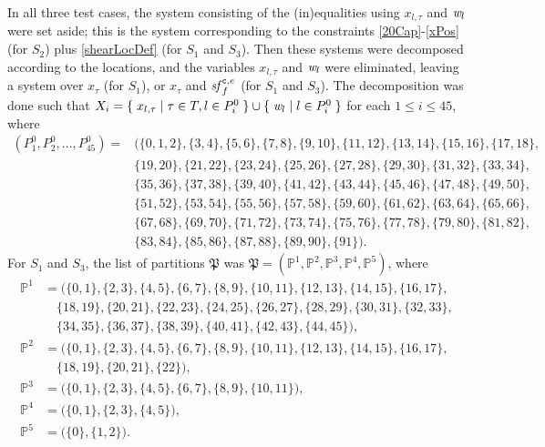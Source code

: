 In all three test cases, the system consisting of the (in)equalities using $x_{l,\tau}$ and $\mathit{w}_l$ were set aside; this is the system corresponding to the constraints \eqref{20Cap}-\eqref{xPos} (for $S_2$) plus \eqref{shearLocDef} (for $S_1$ and $S_3$). Then these systems were decomposed according to the locations, and the variables $x_{l,\tau}$ and $\mathit{w}_l$ were eliminated, leaving a system over $x_\tau$ (for $S_1$), or $x_\tau$ and $\mathit{sf}^{\texttt{c},e}_f$ (for $S_1$ and $S_3$). The decomposition was done such that $X_i = \{\;{x_{l,\tau}}\;|\;{\tau \in T, l\in P^0_i}\;\}\cup\{\;{\mathit{w}_l}\;|\;{l\in P^0_i}\;\}$ for each $1\leq i \leq 45$, where  
\begin{align*}
(P^0_1,P^0_2,\ldots, P^0_{45}) =
&\big(\{0,1,2\}, \{3,4\}, \{5,6\}, \{7,8\}, \{9,10\}, \{11,12\}, \{13,14\}, \{15,16\}, \{17,18\}, \\
&\{19,20\}, \{21,22\},\{23,24\}, \{25,26\}, \{27,28\}, \{29,30\}, \{31,32\}, \{33,34\}, \\
&\{35,36\}, \{37,38\}, \{39,40\}, \{41,42\}, \{43,44\}, \{45,46\}, \{47,48\}, \{49,50\}, \\
&\{51,52\}, \{53,54\}, \{55,56\}, \{57,58\}, \{59,60\}, \{61,62\}, \{63,64\}, \{65,66\}, \\
&\{67,68\}, \{69,70\}, \{71,72\}, \{73,74\}, \{75,76\}, \{77,78\}, \{79,80\}, \{81,82\}, \\
&\{83,84\}, \{85,86\}, \{87,88\}, \{89,90\}, \{91\}\big).
\end{align*}
For $S_1$ and $S_3$, the list of partitions $\mathfrak{P}$ was $\mathfrak{P} = (\mathbb{P}^1, \mathbb{P}^2, \mathbb{P}^3, \mathbb{P}^4, \mathbb{P}^5)$, where 
\begin{align*}
\mathbb{P}^1 &= \big( \{0,1\}, \{2,3\}, \{4,5\}, \{6,7\}, \{8,9\}, \{10,11\}, \{12,13\}, \{14,15\}, \{16,17\},\\
						 & \quad \{18,19\}, \{20,21\}, \{22,23\}, \{24,25\}, \{26,27\}, \{28,29\}, \{30,31\}, \{32,33\},\\
						 & \quad \{34,35\}, \{36,37\}, \{38,39\}, \{40,41\}, \{42,43\}, \{44,45\} \big),\\
\mathbb{P}^2 &= \big( \{0,1\}, \{2,3\}, \{4,5\}, \{6,7\}, \{8,9\}, \{10,11\}, \{12,13\}, \{14,15\}, \{16,17\},\\
						 & \quad \{18,19\}, \{20,21\}, \{22\} \big),\\
\mathbb{P}^3 &= \big( \{0,1\}, \{2,3\}, \{4,5\}, \{6,7\}, \{8,9\}, \{10,11\} \big),\\
\mathbb{P}^4 &= \big( \{0,1\}, \{2,3\}, \{4,5\} \big),\\
\mathbb{P}^5 &= \big(\{0\}, \{1,2\} \big).
\end{align*}
